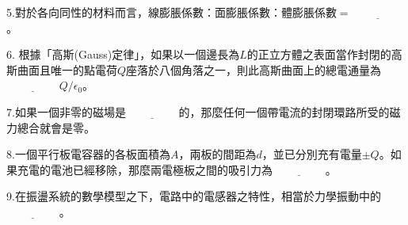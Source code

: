 \documentclass[cn,10pt,math=newtx,chinesefont=founder,device=ig]{elegantbook}
\begin{document}
\newpage


\begin{example}
   5.對於各向同性的材料而言，線膨脹係數：面膨脹係數：體膨脹係數$ = \underline{\hspace{2cm}}$。\\
    \rightline{[桃園聯招教甄109]}
\end{example}
\begin{solution}
    
\end{solution}

\newpage



\begin{example}
   6. 根據「高斯(Gauss)定律」，如果以一個邊長為$L$的正立方體之表面當作封閉的高斯曲面且唯一的點電荷$Q$座落於八個角落之一，則此高斯曲面上的總電通量為$\underline{\hspace{2cm}} Q /\epsilon_0$。\\
    \rightline{[桃園聯招教甄109]}
\end{example}
\begin{solution}
    
\end{solution}

\newpage


\begin{example}
   7.如果一個非零的磁場是$\underline{\hspace{2cm}}$的，那麼任何一個帶電流的封閉環路所受的磁力總合就會是零。\\
    \rightline{[桃園聯招教甄109]}
\end{example}
\begin{solution}
    
\end{solution}

\newpage


\begin{example}
   8.一個平行板電容器的各板面積為$A$，兩板的間距為$d$，並已分別充有電量$\pm Q$。如果充電的電池已經移除，那麼兩電極板之間的吸引力為$\underline{\hspace{2cm}}$。\\
    \rightline{[桃園聯招教甄109]}
\end{example}
\begin{solution}
    
\end{solution}

\newpage


\begin{example}
   9.在振盪系統的數學模型之下，電路中的電感器之特性，相當於力學振動中的$\underline{\hspace{2cm}}$。\\
    \rightline{[桃園聯招教甄109]}
\end{example}
\begin{solution}
    
\end{solution}
\end{document}

